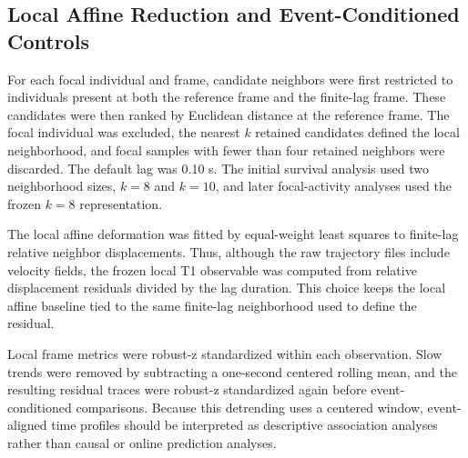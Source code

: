 \subsection{Local Affine Reduction and Event-Conditioned Controls}

For each focal individual and frame, candidate neighbors were first restricted
to individuals present at both the reference frame and the finite-lag frame.
These candidates were then ranked by Euclidean distance at the reference
frame. The focal individual was excluded, the nearest $k$ retained candidates
defined the local neighborhood, and focal samples with fewer than four
retained neighbors were discarded. The default lag was 0.10 s. The initial
survival analysis used two neighborhood sizes, $k=8$ and $k=10$, and later
focal-activity analyses used the frozen $k=8$ representation.

The local affine deformation was fitted by equal-weight least squares to
finite-lag relative neighbor displacements. Thus, although the raw trajectory
files include velocity fields, the frozen local T1 observable was computed
from relative displacement residuals divided by the lag duration. This choice
keeps the local affine baseline tied to the same finite-lag neighborhood used
to define the residual.

Local frame metrics were robust-z standardized within each observation. Slow
trends were removed by subtracting a one-second centered rolling mean, and the
resulting residual traces were robust-z standardized again before
event-conditioned comparisons. Because this detrending uses a centered window,
event-aligned time profiles should be interpreted as descriptive association
analyses rather than causal or online prediction analyses.

